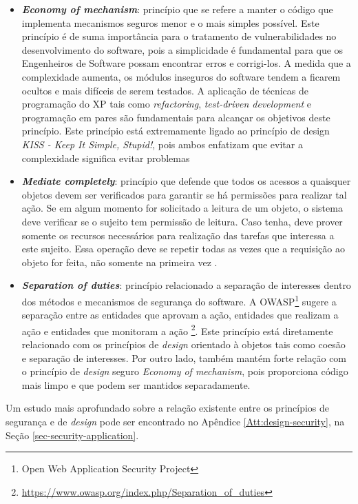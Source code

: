 \begin{itemize}
\item \textbf{\emph{Economy of mechanism}}: princípio que se refere a manter o código que implementa mecanismos seguros menor e o mais simples possível. Este princípio é de suma importância para o tratamento de vulnerabilidades no desenvolvimento do software, pois a simplicidade é fundamental para que os Engenheiros de Software possam encontrar erros e corrigi-los. A medida que a complexidade aumenta, os módulos inseguros do software tendem a ficarem ocultos e mais difíceis de serem testados. A aplicação de técnicas de programação do XP tais como \emph{refactoring}, \emph{test-driven development} e programação em pares são fundamentais para alcançar os objetivos deste princípio. Este princípio está extremamente ligado ao princípio de design \emph{KISS - Keep It Simple, Stupid!}, pois ambos enfatizam que evitar a complexidade significa evitar problemas \cite{mcgraw2002}

\item \textbf{\emph{Mediate completely}}: princípio que defende que todos os acessos a quaisquer objetos devem ser verificados para garantir se há permissões para realizar tal ação. Se em algum momento for solicitado a leitura de um objeto, o sistema deve verificar se o sujeito tem permissão de leitura. Caso tenha, deve prover somente os recursos necessários para realização das tarefas que interessa a este sujeito. Essa operação deve se repetir todas as vezes que a requisição ao objeto for feita, não somente na primeira vez \cite{bishop2003}.

\item \textbf{\emph{Separation of duties}}: princípio relacionado a separação de interesses dentro dos métodos e mecanismos de segurança do software. A OWASP\footnote{Open Web Application Security Project} sugere a separação entre as entidades que aprovam a ação, entidades que realizam a ação e entidades que monitoram a ação \footnote{\url{https://www.owasp.org/index.php/Separation_of_duties}}. Este princípio está diretamente relacionado com os princípios de \emph{design} orientado à objetos tais como coesão e separação de interesses. Por outro lado, também mantém forte relação com o princípio de \emph{design} seguro \emph{Economy of mechanism}, pois proporciona código mais limpo e que podem ser mantidos separadamente.
\end{itemize}

Um estudo mais aprofundado sobre a relação existente entre os princípios de segurança e de \emph{design} pode ser encontrado no Apêndice \ref{Att:design-security}, na Seção \ref{sec-security-application}.

